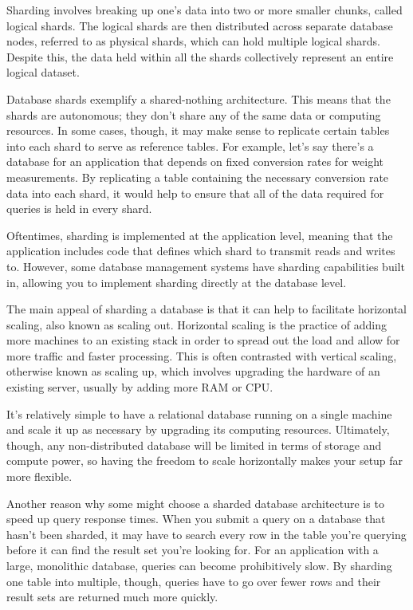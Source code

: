 \documentclass[a4paper, 11.25pt]{article}
\begin{document}
Sharding involves breaking up one’s data into two or more smaller chunks, called logical shards. The logical shards are then distributed across separate database nodes, referred to as physical shards, which can hold multiple logical shards. Despite this, the data held within all the shards collectively represent an entire logical dataset.

Database shards exemplify a shared-nothing architecture. This means that the shards are autonomous; they don’t share any of the same data or computing resources. In some cases, though, it may make sense to replicate certain tables into each shard to serve as reference tables. For example, let’s say there’s a database for an application that depends on fixed conversion rates for weight measurements. By replicating a table containing the necessary conversion rate data into each shard, it would help to ensure that all of the data required for queries is held in every shard.

Oftentimes, sharding is implemented at the application level, meaning that the application includes code that defines which shard to transmit reads and writes to. However, some database management systems have sharding capabilities built in, allowing you to implement sharding directly at the database level.

The main appeal of sharding a database is that it can help to facilitate horizontal scaling, also known as scaling out. Horizontal scaling is the practice of adding more machines to an existing stack in order to spread out the load and allow for more traffic and faster processing. This is often contrasted with vertical scaling, otherwise known as scaling up, which involves upgrading the hardware of an existing server, usually by adding more RAM or CPU.

It’s relatively simple to have a relational database running on a single machine and scale it up as necessary by upgrading its computing resources. Ultimately, though, any non-distributed database will be limited in terms of storage and compute power, so having the freedom to scale horizontally makes your setup far more flexible.

Another reason why some might choose a sharded database architecture is to speed up query response times. When you submit a query on a database that hasn’t been sharded, it may have to search every row in the table you’re querying before it can find the result set you’re looking for. For an application with a large, monolithic database, queries can become prohibitively slow. By sharding one table into multiple, though, queries have to go over fewer rows and their result sets are returned much more quickly.
\end{document}
